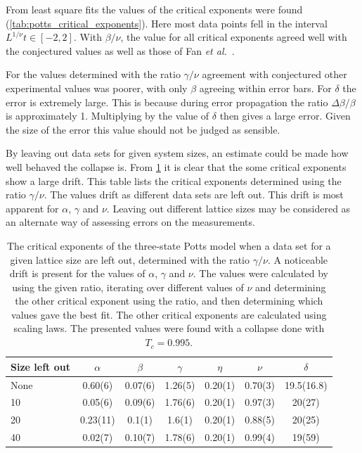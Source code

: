 \documentclass[11pt, a4paper]{report} %
\begin{document}
From least square fits the values of the critical exponents were found (\cref{tab:potts_critical_exponents}).
Here most data points fell in the interval \(L^{1/\nu}t \in [-2, 2]\).
With \(\beta/\nu\), the value for all critical exponents agreed well with the conjectured values as well as those of Fan \textit{et al.}~\cite{fan:2007}.


For the values determined with the ratio \(\gamma / \nu\) agreement with conjectured other experimental values was poorer, with only \(\beta\) agreeing within error bars.
For \(\delta\) the error is extremely large. This is because during error propagation the ratio \(\Delta \beta / \beta\) is approximately 1.
Multiplying by the value of \(\delta\) then gives a large error.
Given the size of the error this value should not be judged as sensible.

By leaving out data sets for given system sizes, an estimate could be made how well behaved the collapse is.
From \cref{tab:potts_leave_out} it is clear that the some critical exponents show a large drift.
This table lists the critical exponents determined using the ratio \(\gamma/\nu\).
The values drift as different data sets are left out.
This drift is most apparent for \(\alpha\), \(\gamma\) and \(\nu\).
Leaving out different lattice sizes may be considered as an alternate way of assessing errors on the measurements.

\begin{table}[htb]
	\begin{adjustbox}{center}
		\centering
		\renewcommand{\arraystretch}{1.5}
		\begin{tabular}{l | c c c c c c}
			\hline
			Size left out& \(\alpha\) & \(\beta\) & \(\gamma\) & \(\eta\) & \(\nu\) & \(\delta\) \\\hline
			None & 0.60(6) & 0.07(6) & 1.26(5) & 0.20(1) & 0.70(3) & 19.5(16.8)\\
			10 & 0.05(6) & 0.09(6) & 1.76(6)& 0.20(1) & 0.97(3) & 20(27) \\
			20 & 0.23(11) & 0.1(1) & 1.6(1) & 0.20(1) & 0.88(5) & 20(25) \\
			40 & 0.02(7) & 0.10(7) & 1.78(6) & 0.20(1)&  0.99(4) & 19(59) \\ \hline
		\end{tabular}
	\end{adjustbox}
	\caption{The critical exponents of the three-state Potts model when a data set for a given lattice size are left out, determined with the ratio \(\gamma/\nu\).
	A noticeable drift is present for the values of \(\alpha\), \(\gamma\) and \(\nu\).
	The values were calculated by using the given ratio, iterating over different values of \(\nu\) and determining the other critical exponent using the ratio, and then determining which values gave the best fit. The other critical exponents are calculated using scaling laws. The presented values were found with a collapse done with \(T_c=0.995\).}
	\label{tab:potts_leave_out}
\end{table}
\end{document}
